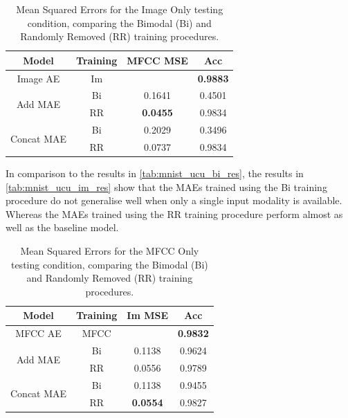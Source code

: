 \begin{table}
	\centering
		\begin{tabular}{|c|c|c|c|}
		\hline
		\textbf{Model} & \textbf{Training} &  \textbf{MFCC MSE} &  \textbf{Acc} \\ \hline
		Image AE & Im 		&  		    			& \textbf{0.9883}	\\ \hline		
\multirow{2}{*}{Add MAE} & Bi & 	0.1641			& 0.4501 			\\ \cline{2-4}
						  & RR & \textbf{0.0455}	& 0.9834 			\\ \hline	
		
\multirow{2}{*}{Concat MAE} & Bi & 	0.2029		&	0.3496 			\\ \cline{2-4}		
							 & RR & 	0.0737		&	0.9834 			\\ \hline
		\end{tabular}
		\caption{Mean Squared Errors for the Image Only testing condition, comparing the Bimodal (Bi) and Randomly Removed (RR) training procedures.}
		\label{tab:mnist_ucu_im_res}

\end{table}

In comparison to the results in \autoref{tab:mnist_ucu_bi_res}, the results in \autoref{tab:mnist_ucu_im_res} show that the \acp{MAE} trained using the Bi training procedure do not generalise well when only a single input modality is available. Whereas the \acp{MAE} trained using the RR training procedure perform almost as well as the baseline model. 
\begin{table}[h]
	\centering
		\begin{tabular}{|c|c|c|c|}
		\hline
		\textbf{Model} & \textbf{Training} & \textbf{Im MSE} &  \textbf{Acc} \\ \hline
				
				MFCC AE & MFCC & 					& 	\textbf{0.9832}	\\ \hline		
\multirow{2}{*}{Add MAE} & Bi & 	0.1138			& 	0.9624 			\\ \cline{2-4}
						  & RR &	0.0556			&	0.9789			\\ \hline	
		
\multirow{2}{*}{Concat MAE} & Bi &	0.1138			&	0.9455			\\ \cline{2-4}		
							 & RR & \textbf{0.0554}	& 	0.9827 			\\ \hline
		\end{tabular}
		\caption{Mean Squared Errors for the MFCC Only testing condition, comparing the Bimodal (Bi) and Randomly Removed (RR) training procedures. }
		\label{tab:mnist_ucu_mfcc_res}

\end{table}


